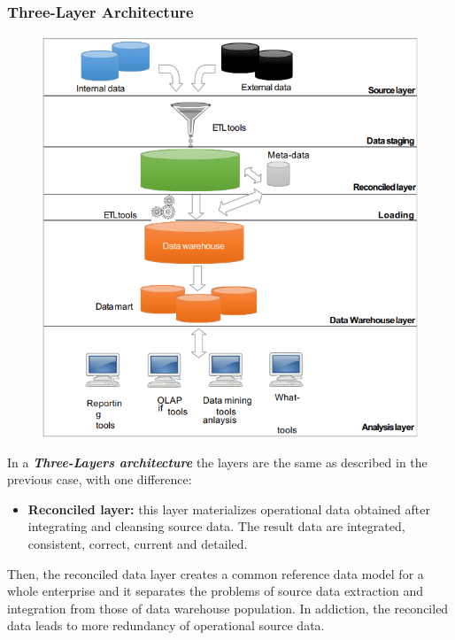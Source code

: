 \subsubsection{Three-Layer Architecture}

\begin{figure}
    \centering
    \includegraphics[scale=0.57]{images/DWH_three_layers.png}
\end{figure}

In a \textbf{\textit{Three-Layers architecture}} the layers are the same as described in the previous case, with one difference:
\begin{itemize}
    \item \textbf{Reconciled layer:} this layer materializes operational data obtained after integrating and cleansing source data. The result data are integrated, consistent, correct, current and detailed.
\end{itemize}

Then, the reconciled data layer creates a common reference data model for a whole enterprise and it separates the problems of source data extraction and integration from those of data warehouse population. In addiction, the reconciled data leads to more redundancy of operational source data.

